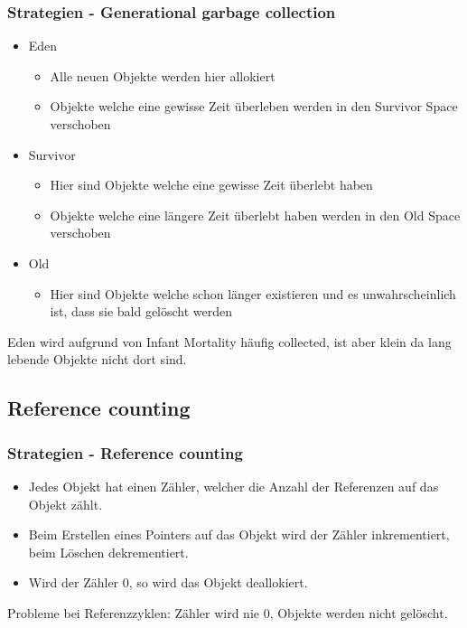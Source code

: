 \documentclass{beamer}
\begin{document}
            \begin{frame}
                \frametitle{Strategien - Generational garbage collection}
                \begin{itemize}
                    \item Eden
                    \begin{itemize}
                        \item Alle neuen Objekte werden hier allokiert
                        \item Objekte welche eine gewisse Zeit überleben werden in den Survivor Space verschoben
                    \end{itemize}
                    \item Survivor
                    \begin{itemize}
                        \item Hier sind Objekte welche eine gewisse Zeit überlebt haben
                        \item Objekte welche eine längere Zeit überlebt haben werden in den Old Space verschoben
                    \end{itemize}
                    \item Old
                    \begin{itemize}
                        \item Hier sind Objekte welche schon länger existieren und es unwahrscheinlich ist, dass sie bald gelöscht werden
                    \end{itemize}
                \end{itemize}
                Eden wird aufgrund von Infant Mortality häufig collected, ist aber klein da lang lebende Objekte nicht dort sind.
            \end{frame}

        \subsection{Reference counting}
            \begin{frame}
                \frametitle{Strategien - Reference counting}

                \begin{itemize}
                    \item Jedes Objekt hat einen Zähler, welcher die Anzahl der Referenzen auf das Objekt zählt.\\
                    \item Beim Erstellen eines Pointers auf das Objekt wird der Zähler inkrementiert, beim Löschen dekrementiert.\\
                    \item Wird der Zähler 0, so wird das Objekt deallokiert.
                \end{itemize}
                Probleme bei Referenzzyklen: Zähler wird nie 0, Objekte werden nicht gelöscht.
            \end{frame}
\end{document}
